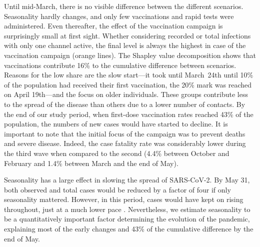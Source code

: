 \begin{figure}[!tp]
\end{figure}

Until mid-March, there is no visible difference between the different scenarios.
Seasonality hardly changes, and only few vaccinations and rapid tests were administered.
Even thereafter, the effect of the vaccination campaign is surprisingly small at first
sight. Whether considering recorded or total infections with only one channel active,
the final level is always the highest in case of the vaccination campaign (orange
lines). The Shapley value decomposition shows that vaccinations contribute 16\% to the
cumulative difference between scenarios. Reasons for the low share are the slow
start---it took until March~24th until 10\% of the population had received their first
vaccination, the 20\% mark was reached on April 19th---and the focus on older
individuals. These groups contribute less to the spread of the disease than others due
to a lower number of contacts. By the end of our study period, when first-dose
vaccination rates reached 43\% of the population, the numbers of new cases would have
started to decline. It is important to note that the initial focus of the campaign was
to prevent deaths and severe disease. Indeed, the case fatality rate was considerably
lower during the third wave when compared to the second (4.4\% between October and
February and 1.4\% between March and the end of May).

Seasonality has a large effect in slowing the spread of SARS-CoV-2. By May 31, both
observed and total cases would be reduced by a factor of four if only seasonality
mattered. However, in this period, cases would have kept on rising throughout, just at a
much lower pace \citep[this is in line with results in][, which our seasonality measure
is based on]{Gavenciak2021}. Nevertheless, we estimate seasonality to be a quantitatively
important factor determining the evolution of the pandemic, explaining most of the early
changes and 43\% of the cumulative difference by the end of May.

